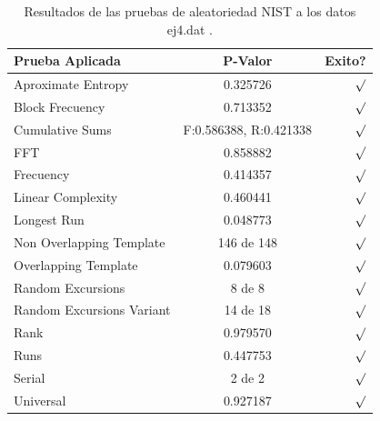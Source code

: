 \documentclass[10pt]{IEEEtran}
\begin{document}
\begin{table}[H]
\caption{Resultados de las pruebas de aleatoriedad NIST a los datos ej4.dat .}
\label{caso1}
\begin{center}
\begin{small}
\begin{tabular}{|l|c|r|}
\hline

Prueba Aplicada &  P-Valor & Exito? \\
\hline

Aproximate Entropy    &    0.325726  & $\surd$ \\

Block Frecuency  & 0.713352  &  $\surd$  \\

Cumulative Sums    &   F:0.586388, R:0.421338 & $\surd$ \\

FFT    &   0.858882 &  $\surd$     \\

Frecuency     &  0.414357  &  $\surd$   \\

Linear Complexity      &  0.460441  & $\surd$ \\

Longest Run      &   0.048773  &    $\surd$      \\

Non Overlapping Template      & 146 de 148    &     $\surd$          \\

Overlapping Template      &  0.079603   &      $\surd$      \\

Random Excursions      & 8 de 8  &    $\surd$      \\

Random Excursions Variant & 14 de 18 &     $\surd$    \\

Rank & 0.979570 &      $\surd$      \\

Runs &    0.447753  &     $\surd$        \\

Serial &     2 de 2    &     $\surd$        \\

Universal &     0.927187  &   $\surd$            \\

\hline

\end{tabular}
\end{small}
\end{center}
\end{table}
\end{document}
